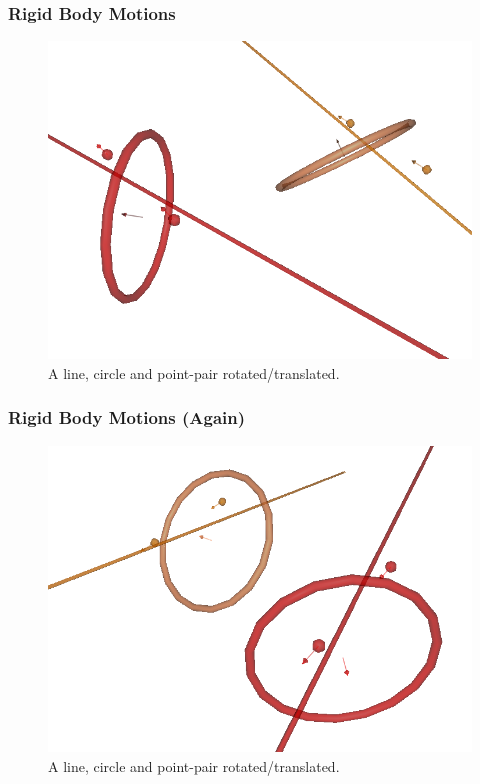 \documentclass{beamer}
\begin{document}
\begin{frame}
\frametitle{Rigid Body Motions}
\begin{figure}
\centering
\includegraphics[scale=0.4]{TranslateRotatePerspectiveOne}
\caption{A line, circle and point-pair rotated/translated.}
\end{figure}
\end{frame}

\begin{frame}
\frametitle{Rigid Body Motions (Again)}
\begin{figure}
\centering
\includegraphics[scale=0.4]{TranslateRotatePerspectiveTwo}
\caption{A line, circle and point-pair rotated/translated.}
\end{figure}
\end{frame}
\end{document}
